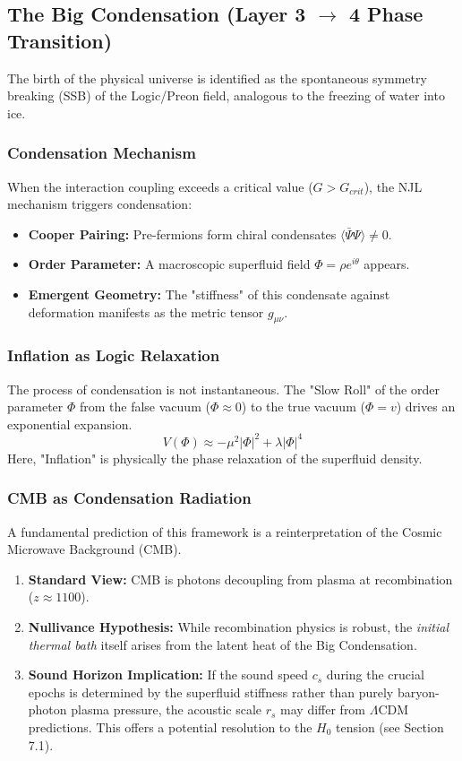 \documentclass[a4paper,12pt]{article}
\begin{document}
\subsection{The Big Condensation (Layer 3 $\to$ 4 Phase Transition)}

The birth of the physical universe is identified as the spontaneous symmetry breaking (SSB) of the Logic/Preon field, analogous to the freezing of water into ice.

\subsubsection{Condensation Mechanism}
When the interaction coupling exceeds a critical value ($G > G_{crit}$), the NJL mechanism triggers condensation:
\begin{itemize}
    \item \textbf{Cooper Pairing:} Pre-fermions form chiral condensates $\langle \bar{\Psi}\Psi \rangle \neq 0$.
    \item \textbf{Order Parameter:} A macroscopic superfluid field $\Phi = \rho e^{i\theta}$ appears.
    \item \textbf{Emergent Geometry:} The "stiffness" of this condensate against deformation manifests as the metric tensor $g_{\mu\nu}$.
\end{itemize}

\subsubsection{Inflation as Logic Relaxation}
The process of condensation is not instantaneous. The "Slow Roll" of the order parameter $\Phi$ from the false vacuum ($\Phi \approx 0$) to the true vacuum ($\Phi = v$) drives an exponential expansion.
\begin{equation}
 V(\Phi) \approx -\mu^2 |\Phi|^2 + \lambda |\Phi|^4
\end{equation}
Here, "Inflation" is physically the phase relaxation of the superfluid density.

\subsubsection{CMB as Condensation Radiation}
A fundamental prediction of this framework is a reinterpretation of the Cosmic Microwave Background (CMB).
\begin{enumerate}
    \item \textbf{Standard View:} CMB is photons decoupling from plasma at recombination ($z \approx 1100$).
    \item \textbf{Nullivance Hypothesis:} While recombination physics is robust, the \emph{initial thermal bath} itself arises from the latent heat of the Big Condensation.
    \item \textbf{Sound Horizon Implication:} If the sound speed $c_s$ during the crucial epochs is determined by the superfluid stiffness rather than purely baryon-photon plasma pressure, the acoustic scale $r_s$ may differ from $\Lambda$CDM predictions. This offers a potential resolution to the $H_0$ tension (see Section 7.1).
\end{enumerate}
\end{document}
